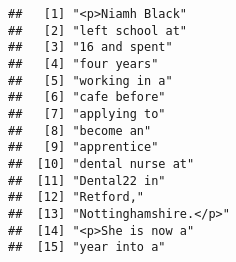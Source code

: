 \documentclass[]{article}
\newenvironment{Shaded}{\begin{snugshade}}{\end{snugshade}}
\newcommand{\KeywordTok}[1]{\textcolor[rgb]{0.13,0.29,0.53}{\textbf{#1}}}
\newcommand{\DataTypeTok}[1]{\textcolor[rgb]{0.13,0.29,0.53}{#1}}
\newcommand{\DecValTok}[1]{\textcolor[rgb]{0.00,0.00,0.81}{#1}}
\newcommand{\OperatorTok}[1]{\textcolor[rgb]{0.81,0.36,0.00}{\textbf{#1}}}
\newcommand{\NormalTok}[1]{#1}
\begin{document}
\begin{Shaded}
\end{Shaded}

\begin{verbatim}
##   [1] "<p>Niamh Black"                                                                                                                           
##   [2] "left school at"                                                                                                                           
##   [3] "16 and spent"                                                                                                                             
##   [4] "four years"                                                                                                                               
##   [5] "working in a"                                                                                                                             
##   [6] "cafe before"                                                                                                                              
##   [7] "applying to"                                                                                                                              
##   [8] "become an"                                                                                                                                
##   [9] "apprentice"                                                                                                                               
##  [10] "dental nurse at"                                                                                                                          
##  [11] "Dental22 in"                                                                                                                              
##  [12] "Retford,"                                                                                                                                 
##  [13] "Nottinghamshire.</p>"                                                                                                                     
##  [14] "<p>She is now a"                                                                                                                          
##  [15] "year into a"                                                                                                                              

\end{verbatim}
\end{document}
